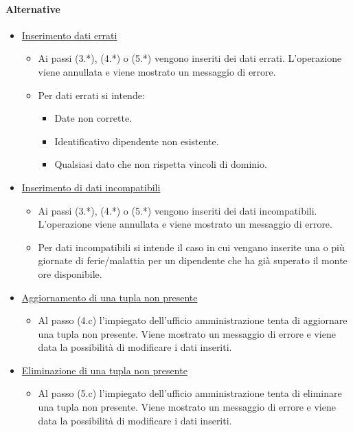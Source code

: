 \paragraph{Alternative}
\begin{itemize}
	\item \underline{Inserimento dati errati}
		\begin{itemize}
			\item Ai passi (3.*), (4.*) o (5.*) vengono inseriti dei dati errati. L'operazione viene annullata e viene mostrato un messaggio di errore.
			\item Per dati errati si intende:
				\begin{itemize}
					\item Date non corrette.
					\item Identificativo dipendente non esistente.
					\item Qualsiasi dato che non rispetta vincoli di dominio.
				\end{itemize}
		\end{itemize}
	\item \underline{Inserimento di dati incompatibili}
		\begin{itemize}
			\item Ai passi (3.*), (4.*) o (5.*) vengono inseriti dei dati incompatibili. L'operazione viene annullata e viene mostrato un messaggio di errore.
			\item Per dati incompatibili si intende il caso in cui vengano inserite una o più giornate di ferie/malattia per un dipendente che ha già superato il monte ore disponibile.
		\end{itemize}
	\item \underline{Aggiornamento di una tupla non presente}
		\begin{itemize}
			\item Al passo (4.c) l'impiegato dell'ufficio amministrazione tenta di aggiornare una tupla non presente. Viene mostrato un messaggio di errore e viene data la possibilità di modificare i dati inseriti.
		\end{itemize}
	\item \underline{Eliminazione di una tupla non presente}
		\begin{itemize}
			\item Al passo (5.c) l'impiegato dell'ufficio amministrazione tenta di eliminare una tupla non presente. Viene mostrato un messaggio di errore e viene data la possibilità di modificare i dati inseriti.
		\end{itemize}
\end{itemize}
